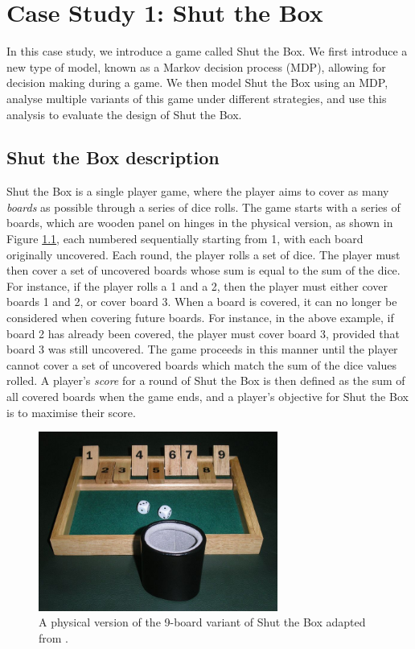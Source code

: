 \chapter{Case Study 1: Shut the Box}
\label{cs1}

In this case study, we introduce a game called Shut the Box. We first introduce a new type of model, known as a Markov decision process (MDP), allowing for decision making during a game. We then model Shut the Box using an MDP, analyse multiple variants of this game under different strategies, and use this analysis to evaluate the design of Shut the Box.

\section{Shut the Box description}
\label{cs1:stb_description}

Shut the Box is a single player game, where the player aims to cover as many \emph{boards} as possible through a series of dice rolls. The game starts with a series of boards, which are wooden panel on hinges in the physical version, as shown in Figure \ref{cs1:physical_stb}, each numbered sequentially starting from 1, with each board originally uncovered. Each round, the player rolls a set of dice. The player must then cover a set of uncovered boards whose sum is equal to the sum of the dice. For instance, if the player rolls a 1 and a 2, then the player must either cover boards 1 and 2, or cover board 3. When a board is covered, it can no longer be considered when covering future boards. For instance, in the above example, if board 2 has already been covered, the player must cover  board 3, provided that board 3 was still uncovered. The game proceeds in this manner until the player cannot cover a set of uncovered boards which match the sum of the dice values rolled. A player's \emph{score} for a round of Shut the Box is then defined as the sum of all covered boards when the game ends, and a player's objective for Shut the Box is to maximise their score.

\begin{figure}[h]
    \centering
    \includegraphics[width=0.7\textwidth]{images/shut_the_box.jpg}
    \caption{A physical version of the 9-board variant of Shut the Box adapted from \cite{wikipedia_deutsch_2006}.}
    \label{cs1:physical_stb}
\end{figure}

